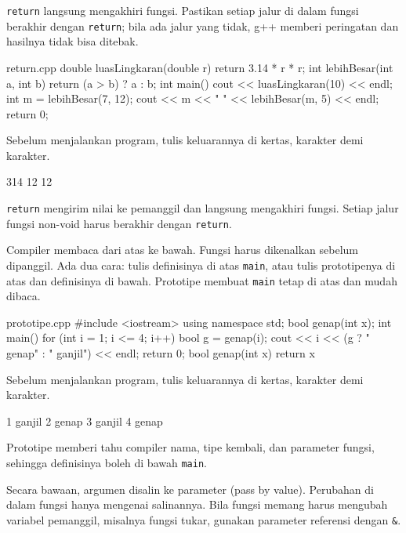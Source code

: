 \documentclass[a4paper]{article}
\begin{document}
\texttt{return} langsung mengakhiri fungsi. Pastikan setiap jalur di dalam fungsi berakhir dengan \texttt{return}; bila ada jalur yang tidak, g++ memberi peringatan dan hasilnya tidak bisa ditebak.

\begin{MKode}{return.cpp}
double luasLingkaran(double r) {
    return 3.14 * r * r;
}
int lebihBesar(int a, int b) {
    return (a > b) ? a : b;
}
int main() {
    cout << luasLingkaran(10) << endl;
    int m = lebihBesar(7, 12);
    cout << m << " " << lebihBesar(m, 5) << endl;
    return 0;
}
\end{MKode}
\begin{Tebak}[]
Sebelum menjalankan program, tulis keluarannya di kertas, karakter demi karakter.
\end{Tebak}
\begin{Jawaban}[]
\begin{MKeluaran}[]
314
12 12
\end{MKeluaran}
\texttt{return} mengirim nilai ke pemanggil dan langsung mengakhiri fungsi. Setiap jalur fungsi non-void harus berakhir dengan \texttt{return}.
\end{Jawaban}
Compiler membaca dari atas ke bawah. Fungsi harus dikenalkan sebelum dipanggil. Ada dua cara: tulis definisinya di atas \texttt{main}, atau tulis prototipenya di atas dan definisinya di bawah. Prototipe membuat \texttt{main} tetap di atas dan mudah dibaca.

\begin{MKode}{prototipe.cpp}
#include <iostream>
using namespace std;
bool genap(int x);
int main() {
    for (int i = 1; i <= 4; i++) {
        bool g = genap(i);
        cout << i << (g ? " genap" : " ganjil") << endl;
    }
    return 0;
}
bool genap(int x) {
    return x %
}
\end{MKode}
\begin{Tebak}[]
Sebelum menjalankan program, tulis keluarannya di kertas, karakter demi karakter.
\end{Tebak}
\begin{Jawaban}[]
\begin{MKeluaran}[]
1 ganjil
2 genap
3 ganjil
4 genap
\end{MKeluaran}
Prototipe memberi tahu compiler nama, tipe kembali, dan parameter fungsi, sehingga definisinya boleh di bawah \texttt{main}.
\end{Jawaban}
Secara bawaan, argumen disalin ke parameter (pass by value). Perubahan di dalam fungsi hanya mengenai salinannya. Bila fungsi memang harus mengubah variabel pemanggil, misalnya fungsi tukar, gunakan parameter referensi dengan \texttt{\&}.
\end{document}
